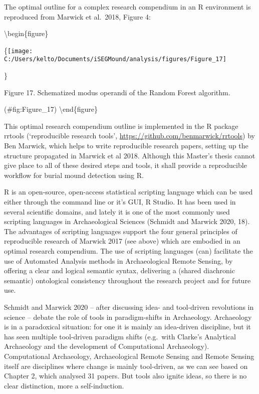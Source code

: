 \documentclass[
]{article}
\begin{document}
The optimal outline for a complex research compendium in an R environment is reproduced from Marwick et al.~2018, Figure 4:

\textbackslash begin\{figure\}

\{\centering \texttt{[image: C:/Users/kelto/Documents/iSEGMound/analysis/figures/Figure\_17]}

\}

\caption{Figure 17. Schematized modus operandi of the Random Forest algorithm.}

(\#fig:Figure\_17)
\textbackslash end\{figure\}

This optimal research compendium outline is implemented in the R package rrtools (`reproducible research tools', \url{https://github.com/benmarwick/rrtools}) by Ben Marwick, which helps to write reproducible research papers, setting up the structure propagated in Marwick et al 2018. Although this Master's thesis cannot give place to all of these desired steps and tools, it shall provide a reproducible workflow for burial mound detection using R.

R is an open-source, open-access statistical scripting language which can be used either through the command line or it's GUI, R Studio. It has been used in several scientific domains, and lately it is one of the most commonly used scripting languages in Archaeological Sciences (Schmidt and Marwick 2020, 18). The advantages of scripting languages support the four general principles of reproducible research of Marwick 2017 (see above) which are embodied in an optimal research compendium. The use of scripting languages (can) facilitate the use of Automated Analysis methods in Archaeological Remote Sensing, by offering a clear and logical semantic syntax, delivering a (shared diachronic semantic) ontological consistency throughout the research project and for future use.

Schmidt and Marwick 2020 -- after discussing idea- and tool-driven revolutions in science -- debate the role of tools in paradigm-shifts in Archaeology. Archaeology is in a paradoxical situation: for one it is mainly an idea-driven discipline, but it has seen multiple tool-driven paradigm shifts (e.g.~with Clarke's Analytical Archaeology and the development of Computational Archaeology). Computational Archaeology, Archaeological Remote Sensing and Remote Sensing itself are disciplines where change is mainly tool-driven, as we can see based on Chapter 2, which analysed 31 papers. But tools also ignite ideas, so there is no clear distinction, more a self-induction.
\end{document}

